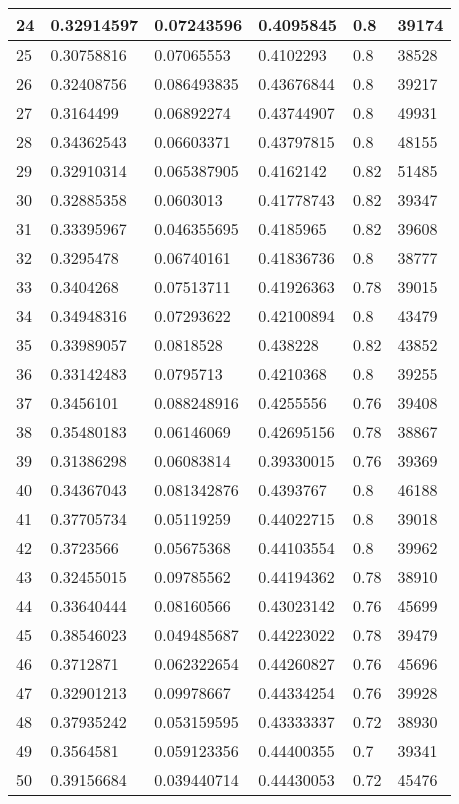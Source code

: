 \begin{longtable}{|l|l|l|l|l|l|}
24 & 0.32914597 & 0.07243596 & 0.4095845 & 0.8 & 39174 \\ \hline 
25 & 0.30758816 & 0.07065553 & 0.4102293 & 0.8 & 38528 \\ \hline 
26 & 0.32408756 & 0.086493835 & 0.43676844 & 0.8 & 39217 \\ \hline 
27 & 0.3164499 & 0.06892274 & 0.43744907 & 0.8 & 49931 \\ \hline 
28 & 0.34362543 & 0.06603371 & 0.43797815 & 0.8 & 48155 \\ \hline 
29 & 0.32910314 & 0.065387905 & 0.4162142 & 0.82 & 51485 \\ \hline 
30 & 0.32885358 & 0.0603013 & 0.41778743 & 0.82 & 39347 \\ \hline 
31 & 0.33395967 & 0.046355695 & 0.4185965 & 0.82 & 39608 \\ \hline 
32 & 0.3295478 & 0.06740161 & 0.41836736 & 0.8 & 38777 \\ \hline 
33 & 0.3404268 & 0.07513711 & 0.41926363 & 0.78 & 39015 \\ \hline 
34 & 0.34948316 & 0.07293622 & 0.42100894 & 0.8 & 43479 \\ \hline 
35 & 0.33989057 & 0.0818528 & 0.438228 & 0.82 & 43852 \\ \hline 
36 & 0.33142483 & 0.0795713 & 0.4210368 & 0.8 & 39255 \\ \hline 
37 & 0.3456101 & 0.088248916 & 0.4255556 & 0.76 & 39408 \\ \hline 
38 & 0.35480183 & 0.06146069 & 0.42695156 & 0.78 & 38867 \\ \hline 
39 & 0.31386298 & 0.06083814 & 0.39330015 & 0.76 & 39369 \\ \hline 
40 & 0.34367043 & 0.081342876 & 0.4393767 & 0.8 & 46188 \\ \hline 
41 & 0.37705734 & 0.05119259 & 0.44022715 & 0.8 & 39018 \\ \hline 
42 & 0.3723566 & 0.05675368 & 0.44103554 & 0.8 & 39962 \\ \hline 
43 & 0.32455015 & 0.09785562 & 0.44194362 & 0.78 & 38910 \\ \hline 
44 & 0.33640444 & 0.08160566 & 0.43023142 & 0.76 & 45699 \\ \hline 
45 & 0.38546023 & 0.049485687 & 0.44223022 & 0.78 & 39479 \\ \hline 
46 & 0.3712871 & 0.062322654 & 0.44260827 & 0.76 & 45696 \\ \hline 
47 & 0.32901213 & 0.09978667 & 0.44334254 & 0.76 & 39928 \\ \hline 
48 & 0.37935242 & 0.053159595 & 0.43333337 & 0.72 & 38930 \\ \hline 
49 & 0.3564581 & 0.059123356 & 0.44400355 & 0.7 & 39341 \\ \hline 
50 & 0.39156684 & 0.039440714 & 0.44430053 & 0.72 & 45476 \\ \hline 
\end{longtable}